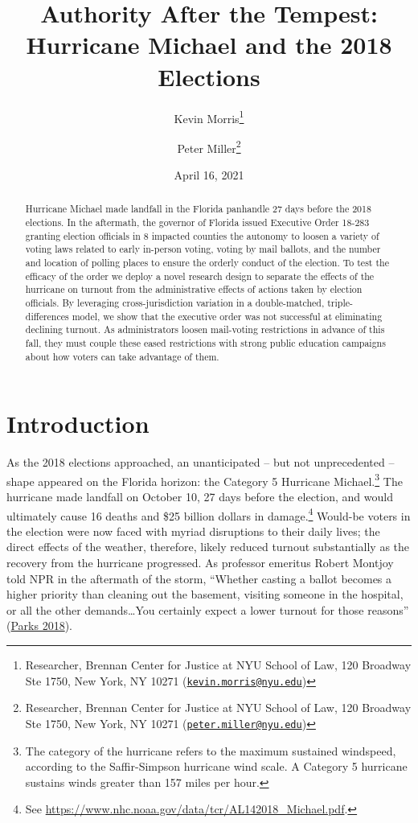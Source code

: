 \documentclass[
  12pt,
]{article}
\title{Authority After the Tempest: Hurricane Michael and the 2018 Elections}
\author{Kevin Morris\footnote{Researcher, Brennan Center for Justice at NYU School of Law, 120 Broadway Ste 1750, New York, NY 10271 (\href{mailto:kevin.morris@nyu.edu}{\nolinkurl{kevin.morris@nyu.edu}})} \and Peter Miller\footnote{Researcher, Brennan Center for Justice at NYU School of Law, 120 Broadway Ste 1750, New York, NY 10271 (\href{mailto:peter.miller@nyu.edu}{\nolinkurl{peter.miller@nyu.edu}})}}
\date{April 16, 2021}
\begin{document}
\maketitle
\begin{abstract}
Hurricane Michael made landfall in the Florida panhandle 27 days before the 2018 elections. In the aftermath, the governor of Florida issued Executive Order 18-283 granting election officials in 8 impacted counties the autonomy to loosen a variety of voting laws related to early in-person voting, voting by mail ballots, and the number and location of polling places to ensure the orderly conduct of the election. To test the efficacy of the order we deploy a novel research design to separate the effects of the hurricane on turnout from the administrative effects of actions taken by election officials. By leveraging cross-jurisdiction variation in a double-matched, triple-differences model, we show that the executive order was not successful at eliminating declining turnout. As administrators loosen mail-voting restrictions in advance of this fall, they must couple these eased restrictions with strong public education campaigns about how voters can take advantage of them.
\end{abstract}

\pagebreak

\doublespacing

\hypertarget{introduction}{%
\section*{Introduction}\label{introduction}}

As the 2018 elections approached, an unanticipated -- but not unprecedented -- shape appeared on the Florida horizon: the Category 5 Hurricane Michael.\footnote{The category of the hurricane refers to the maximum sustained windspeed, according to the Saffir-Simpson hurricane wind scale. A Category 5 hurricane sustains winds greater than 157 miles per hour.} The hurricane made landfall on October 10, 27 days before the election, and would ultimately cause 16 deaths and \$25 billion dollars in damage.\footnote{See \url{https://www.nhc.noaa.gov/data/tcr/AL142018_Michael.pdf}.} Would-be voters in the election were now faced with myriad disruptions to their daily lives; the direct effects of the weather, therefore, likely reduced turnout substantially as the recovery from the hurricane progressed. As professor emeritus Robert Montjoy told NPR in the aftermath of the storm, ``Whether casting a ballot becomes a higher priority than cleaning out the basement, visiting someone in the hospital, or all the other demands\ldots You certainly expect a lower turnout for those reasons'' (\protect\hyperlink{ref-Parks2018}{Parks 2018}).
\end{document}
